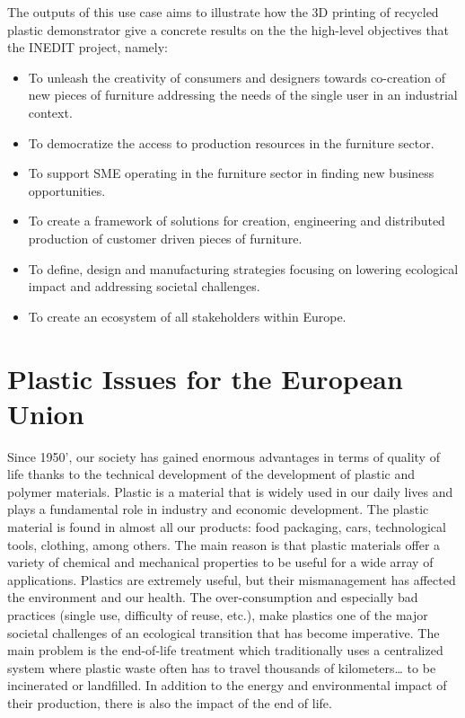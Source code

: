 \documentclass[
  11pt,
]{article}
\providecommand{\tightlist}{%
  \setlength{\itemsep}{0pt}\setlength{\parskip}{0pt}}\usepackage{longtable,booktabs,array}
\begin{document}
The outputs of this use case aims to illustrate how the 3D printing of
recycled plastic demonstrator give a concrete results on the the
high-level objectives that the INEDIT project, namely:

\begin{itemize}
\tightlist
\item
  To unleash the creativity of consumers and designers towards
  co-creation of new pieces of furniture addressing the needs of the
  single user in an industrial context.
\item
  To democratize the access to production resources in the furniture
  sector.
\item
  To support SME operating in the furniture sector in finding new
  business opportunities.
\item
  To create a framework of solutions for creation, engineering and
  distributed production of customer driven pieces of furniture.
\item
  To define, design and manufacturing strategies focusing on lowering
  ecological impact and addressing societal challenges.
\item
  To create an ecosystem of all stakeholders within Europe.
\end{itemize}

\newpage

\hypertarget{sec-plastic}{%
\section{Plastic Issues for the European Union}\label{sec-plastic}}

Since 1950', our society has gained enormous advantages in terms of
quality of life thanks to the technical development of the development
of plastic and polymer materials. Plastic is a material that is widely
used in our daily lives and plays a fundamental role in industry and
economic development. The plastic material is found in almost all our
products: food packaging, cars, technological tools, clothing, among
others. The main reason is that plastic materials offer a variety of
chemical and mechanical properties to be useful for a wide array of
applications. Plastics are extremely useful, but their mismanagement has
affected the environment and our health. The over-consumption and
especially bad practices (single use, difficulty of reuse, etc.), make
plastics one of the major societal challenges of an ecological
transition that has become imperative. The main problem is the
end-of-life treatment which traditionally uses a centralized system
where plastic waste often has to travel thousands of kilometers\ldots{}
to be incinerated or landfilled. In addition to the energy and
environmental impact of their production, there is also the impact of
the end of life.
\end{document}
